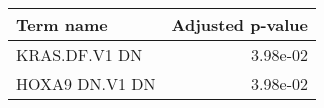 \begin{tabular}{lr}
\toprule
      Term name &  Adjusted p-value \\
\midrule
  KRAS.DF.V1 DN &          3.98e-02 \\
 HOXA9 DN.V1 DN &          3.98e-02 \\
\bottomrule
\end{tabular}
